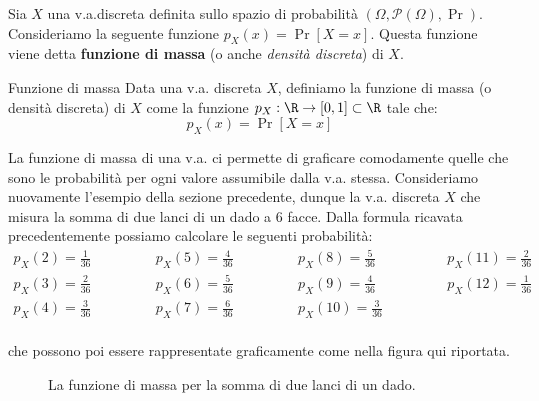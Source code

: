 \documentclass[a4paper, 12pt]{report}
\begin{document}
    Sia $X$ una v.a.discreta definita sullo spazio di probabilità $(\Omega, \mathcal{P}(\Omega), \Pr)$. Consideriamo la seguente funzione $p_X(x) = \Pr[X = x]$. Questa funzione viene detta \textbf{funzione di massa} (o anche \textit{densità discreta}) di $X$.
    
    \begin{frameddefn}{Funzione di massa}
        Data una v.a. discreta $X$, definiamo la funzione di massa (o densità discreta) di $X$ come la funzione $p_X : \R \to [0,1] \subset \R$ tale che:
        \[p_X(x) = \Pr[X = x]\]
    \end{frameddefn}
    
    La funzione di massa di una v.a. ci permette di graficare comodamente quelle che sono le probabilità per ogni valore assumibile dalla v.a. stessa. Consideriamo nuovamente l'esempio della sezione precedente, dunque la v.a. discreta $X$ che misura la somma di due lanci di un dado a 6 facce. Dalla formula ricavata precedentemente possiamo calcolare le seguenti probabilità:
    \[\begin{array}{ccccccc}
        p_X(2) = \frac{1}{36} &\qquad\quad& p_X(5) = \frac{4}{36} &\qquad\quad& p_X(8) = \frac{5}{36} &\qquad\quad& p_X(11) = \frac{2}{36} \\
        p_X(3) = \frac{2}{36} &\qquad\quad& p_X(6) = \frac{5}{36} &\qquad\quad& p_X(9) = \frac{4}{36} &\qquad\quad& p_X(12) = \frac{1}{36} \\
        p_X(4) = \frac{3}{36} &\qquad\quad& p_X(7) = \frac{6}{36} &\qquad\quad& p_X(10) = \frac{3}{36} &\qquad\quad& \\
    \end{array}\]

    che possono poi essere rappresentate graficamente come nella figura qui riportata.

    \begin{figure}[H]
        \centering

        \caption{La funzione di massa per la somma di due lanci di un dado.}
        \label{unif_sum}
    \end{figure}
    
\end{document}
